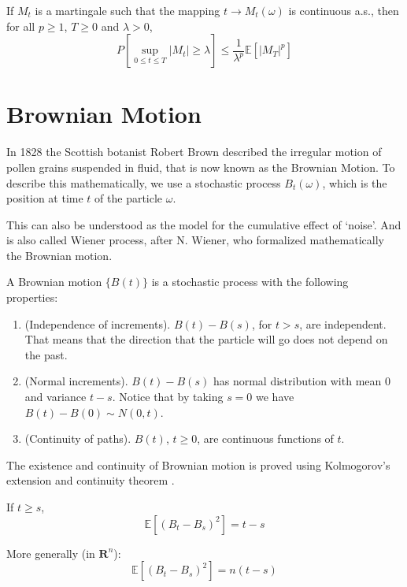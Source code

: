 \begin{theorem}
	If $M_t$ is a martingale such that the mapping $t \longrightarrow M_t(\omega)$ is continuous a.s., then for all $p \geq 1$, $T \geq 0$ and $\lambda > 0$,
	\[
		P \left[ \sup_{0 \leq t \leq T} |M_t| \geq \lambda \right] \leq \frac{1}{\lambda^p} \mathbb{E} [|M_T|^p]
	\]
\end{theorem}

\section{Brownian Motion}

In 1828 the Scottish botanist Robert Brown described the irregular motion of pollen grains suspended in fluid, that is now known as the Brownian Motion. To describe this mathematically, we use a stochastic process $B_t(\omega)$, which is the position at time $t$ of the particle $\omega$.

This can also be understood as the model for the cumulative effect of `noise'. And is also called Wiener process, after N. Wiener, who formalized mathematically the Brownian motion.

\begin{definition}
	A Brownian motion $\{ B(t) \}$ is a stochastic process with the following properties:
	\begin{enumerate}
		\item (Independence of increments). $B(t) - B(s)$, for $t > s$, are independent. That means that the direction that the particle will go does not depend on the past.
		\item (Normal increments). $B(t) - B(s)$ has normal distribution with mean $0$ and variance $t - s$. Notice that by taking $s = 0$ we have $B(t) - B(0) \sim N(0,t)$.
		\item (Continuity of paths). $B(t)$, $t \geq 0$, are continuous functions of $t$. 
	\end{enumerate}
\end{definition}

The existence and continuity of Brownian motion is proved using Kolmogorov's extension and continuity theorem \cite{oksendal2013stochastic}.

\begin{theorem}
	If $t \geq s$,
	\[
		\mathbb{E}[(B_t - B_s)^2] = t - s
	\]
	
	More generally (in $\textbf{R}^n$):
	\[
		\mathbb{E}[(B_t - B_s)^2] = n(t - s)
	\]
\end{theorem}


